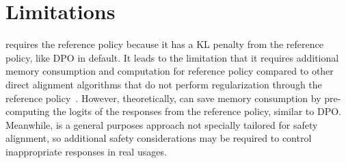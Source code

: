 \section*{Limitations}

\method{} requires the reference policy because it has a KL penalty from the reference policy, like DPO in default. It leads to the limitation that it requires additional memory consumption and computation for reference policy compared to other direct alignment algorithms that do not perform regularization through the reference policy~\cite{zhao2023slic, xu2024contrastive, hong2024orpo, meng2024simpo}. However, theoretically, \method{} can save memory consumption by pre-computing the logits of the responses from the reference policy, similar to DPO. Meanwhile, \method{} is a general purposes approach not specially tailored for safety alignment, so additional safety considerations may be required to control inappropriate responses in real usages.